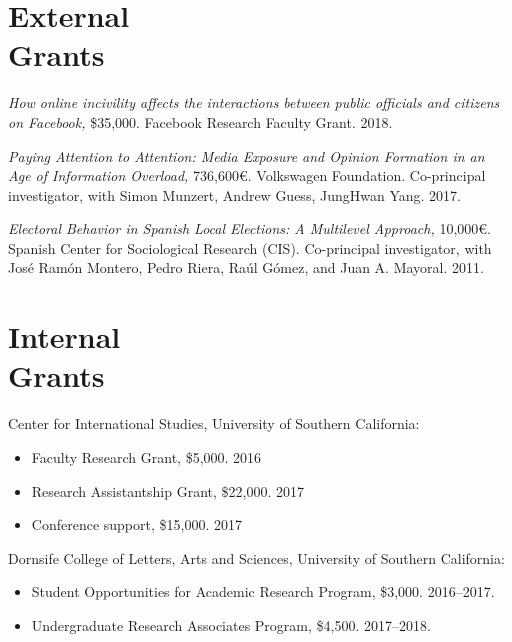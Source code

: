 \documentclass[margin,line,11pt]{resume}
\begin{document}
\begin{resume}

        \section{\mysidestyle External \\ Grants}
        
\textit{How online incivility affects the interactions between public officials and citizens on Facebook,} \$35,000. Facebook Research Faculty Grant. 2018.        
        
\textit{Paying Attention to Attention: Media Exposure and Opinion Formation in an Age of Information Overload,} 736,600\euro. Volkswagen Foundation. Co-principal investigator, with Simon Munzert, Andrew Guess, JungHwan Yang. 2017.

    \textit{Electoral Behavior in Spanish Local Elections: A Multilevel Approach,} 10,000\euro. Spanish Center for Sociological Research (CIS). Co-principal investigator, with Jos\'{e} Ram\'{o}n Montero, Pedro Riera, Ra\'{u}l G\'{o}mez, and Juan A. Mayoral. 2011.    


\newpage

        \section{\mysidestyle Internal\\Grants}

Center for International Studies, University of Southern California:
\begin{itemize}
\item[] Faculty Research Grant, \$5,000. 2016
\vspace{-.15cm}
\item[] Research Assistantship Grant, \$22,000. 2017
\vspace{-.15cm}
\item[] Conference support, \$15,000. 2017
\end{itemize}
Dornsife College of Letters, Arts and Sciences, University of Southern California:
\begin{itemize}
\item[] Student Opportunities for Academic Research Program, \$3,000. 2016--2017.
\vspace{-.15cm}
\item[] Undergraduate Research Associates Program, \$4,500. 2017--2018.
\end{itemize}
 

\end{resume}
\end{document}
